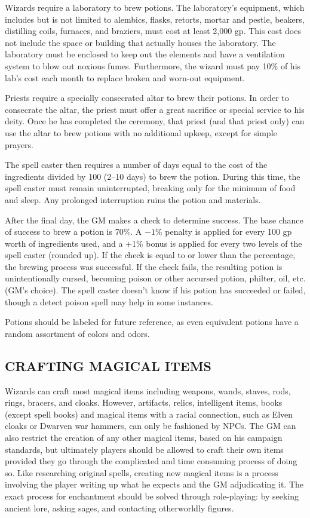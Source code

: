 \begin{multicols}{2}
Wizards require a laboratory to brew potions.  The laboratory's equipment, which includes but is not limited to alembics, flasks, retorts, mortar and pestle, beakers, distilling coils, furnaces, and braziers, must cost at least 2,000 gp.  This cost does not include the space or building that actually houses the laboratory. The laboratory must be enclosed to keep out the elements and have a ventilation system to blow out noxious fumes.  Furthermore, the wizard must pay 10\% of his lab's cost each month to replace broken and worn-out equipment.
 
Priests require a specially consecrated altar to brew their potions.  In order to consecrate the altar, the priest must offer a great sacrifice or special service to his deity.  Once he has completed the ceremony, that priest (and that priest only) can use the altar to brew potions with no additional upkeep, except for simple prayers.
 
The spell caster then requires a number of days equal to the cost of the ingredients divided by 100 (2--10 days) to brew the potion.  During this time, the spell caster must remain uninterrupted, breaking only for the minimum of food and sleep.  Any prolonged interruption ruins the potion and materials.  
 
After the final day, the GM makes a check to determine success.  The base chance of success to brew a potion is 70\%.  A $-1$\% penalty is applied for every 100 gp worth of ingredients used, and a +1\% bonus is applied for every two levels of the spell caster (rounded up).  If the check is equal to or lower than the percentage, the brewing process was successful.  If the check fails, the resulting potion is unintentionally cursed, becoming poison or other accursed potion, philter, oil, etc. (GM's choice).   The spell caster doesn't know if his potion has succeeded or failed, though a detect poison spell may help in some instances.
 
Potions should be labeled for future reference, as even equivalent potions have a random assortment of colors and odors.
 
\subsection{CRAFTING MAGICAL ITEMS}

Wizards can craft most magical items including weapons, wands, staves, rods, rings, bracers, and cloaks. However, artifacts, relics, intelligent items, books (except spell books) and magical items with a racial connection, such as Elven cloaks or Dwarven war hammers, can only be fashioned by NPCs.  The GM can also restrict the creation of any other magical items, based on his campaign standards, but ultimately players should be allowed to craft their own items provided they go through the complicated and time consuming process of doing so.  Like researching original spells, creating new magical items is a process involving the player writing up what he expects and the GM adjudicating it.  The exact process for enchantment should be solved through role-playing: by seeking ancient lore, asking sages, and contacting otherworldly figures.


\end{multicols}
